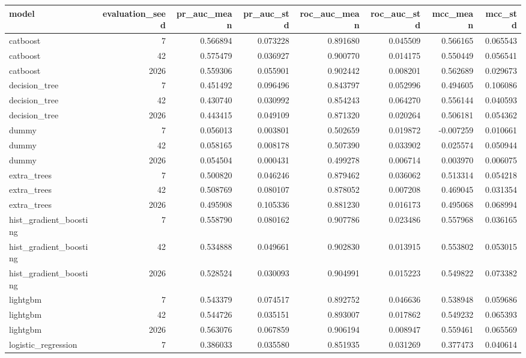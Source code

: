 \begin{tabular}{lrrrrrrr}
\toprule
model & evaluation\_seed & pr\_auc\_mean & pr\_auc\_std & roc\_auc\_mean & roc\_auc\_std & mcc\_mean & mcc\_std \\
\midrule
catboost & 7 & 0.566894 & 0.073228 & 0.891680 & 0.045509 & 0.566165 & 0.065543 \\
catboost & 42 & 0.575479 & 0.036927 & 0.900770 & 0.014175 & 0.550449 & 0.056541 \\
catboost & 2026 & 0.559306 & 0.055901 & 0.902442 & 0.008201 & 0.562689 & 0.029673 \\
decision\_tree & 7 & 0.451492 & 0.096496 & 0.843797 & 0.052996 & 0.494605 & 0.106086 \\
decision\_tree & 42 & 0.430740 & 0.030992 & 0.854243 & 0.064270 & 0.556144 & 0.040593 \\
decision\_tree & 2026 & 0.443415 & 0.049109 & 0.871320 & 0.020264 & 0.506181 & 0.054362 \\
dummy & 7 & 0.056013 & 0.003801 & 0.502659 & 0.019872 & -0.007259 & 0.010661 \\
dummy & 42 & 0.058165 & 0.008178 & 0.507390 & 0.033902 & 0.025574 & 0.050944 \\
dummy & 2026 & 0.054504 & 0.000431 & 0.499278 & 0.006714 & 0.003970 & 0.006075 \\
extra\_trees & 7 & 0.500820 & 0.046246 & 0.879462 & 0.036062 & 0.513314 & 0.054218 \\
extra\_trees & 42 & 0.508769 & 0.080107 & 0.878052 & 0.007208 & 0.469045 & 0.031354 \\
extra\_trees & 2026 & 0.495908 & 0.105336 & 0.881230 & 0.016173 & 0.495068 & 0.068994 \\
hist\_gradient\_boosting & 7 & 0.558790 & 0.080162 & 0.907786 & 0.023486 & 0.557968 & 0.036165 \\
hist\_gradient\_boosting & 42 & 0.534888 & 0.049661 & 0.902830 & 0.013915 & 0.553802 & 0.053015 \\
hist\_gradient\_boosting & 2026 & 0.528524 & 0.030093 & 0.904991 & 0.015223 & 0.549822 & 0.073382 \\
lightgbm & 7 & 0.543379 & 0.074517 & 0.892752 & 0.046636 & 0.538948 & 0.059686 \\
lightgbm & 42 & 0.544726 & 0.035151 & 0.893007 & 0.017862 & 0.549232 & 0.065393 \\
lightgbm & 2026 & 0.563076 & 0.067859 & 0.906194 & 0.008947 & 0.559461 & 0.065569 \\
logistic\_regression & 7 & 0.386033 & 0.035580 & 0.851935 & 0.031269 & 0.377473 & 0.040614 \\

\end{tabular}
